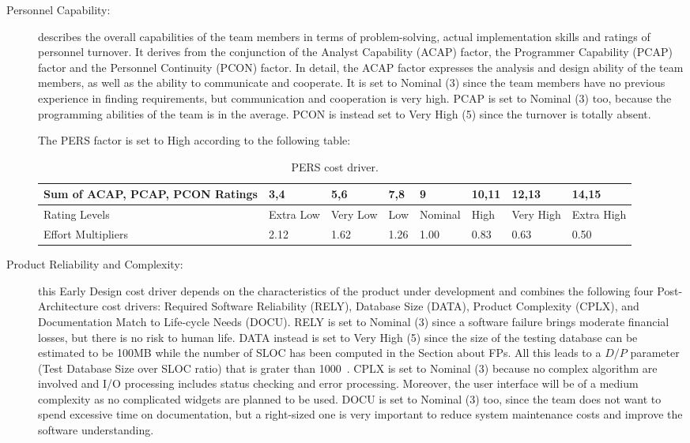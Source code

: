 \begin{description}
\item[Personnel Capability:] describes the overall capabilities of the team members in terms of problem-solving, actual implementation skills and ratings of personnel turnover. It derives from the conjunction of the Analyst Capability (ACAP) factor, the Programmer Capability (PCAP) factor and the Personnel Continuity (PCON) factor. In detail, the ACAP factor expresses the analysis and design ability of the team members, as well as the ability to communicate and cooperate. It is set to Nominal (3) since the team members have no previous experience in finding requirements, but communication and cooperation is very high. PCAP is set to Nominal (3) too, because the programming abilities of the team is in the average. PCON is instead set to Very High (5) since the turnover is totally absent.

The PERS factor is set to High according to the following table:

\begin{table}[H]
	\begin{adjustwidth}{-.5in}{-.5in}
    \centering
    \begin{tabular}{p{4cm}|p{1cm}|p{1cm}|p{1cm}|p{1.5cm}|p{1cm}|p{1cm}|p{1cm}}
        \hline
        Sum of ACAP, PCAP, PCON Ratings & 3,4 & 5,6 & 7,8 & 9 & 10,11 & 12,13 & 14,15 \\
        \hline
        \hline
        Rating Levels & Extra Low & Very Low & Low & Nominal & High & Very High & Extra High \\
        \hline
        Effort Multipliers & 2.12 & 1.62 & 1.26 & 1.00 & 0.83 & 0.63 & 0.50 \\
        \hline
    \end{tabular}
    \caption{PERS cost driver.}
    \end{adjustwidth}
\end{table}

\item[Product Reliability and Complexity:] this Early Design cost driver depends on the characteristics of the product under development and combines the following four Post-Architecture cost drivers: Required Software Reliability (RELY), Database Size (DATA), Product Complexity (CPLX), and Documentation Match to Life-cycle Needs (DOCU). RELY is set to Nominal (3) since a software failure brings moderate financial losses, but there is no risk to human life. DATA instead is set to Very High (5) since the size of the testing database can be estimated to be 100MB while the number of SLOC has been computed in the Section about FPs. All this leads to a $D/P$ parameter (Test Database Size over SLOC ratio) that is grater than 1000~\cite{cocomo-guide}. CPLX is set to Nominal (3) because no complex algorithm are involved and I/O processing includes status checking and error processing. Moreover, the user interface will be of a medium complexity as no complicated widgets are planned to be used. DOCU is set to Nominal (3) too, since the team does not want to spend excessive time on documentation, but a right-sized one is very important to reduce system maintenance costs and improve the software understanding.


\end{description}
